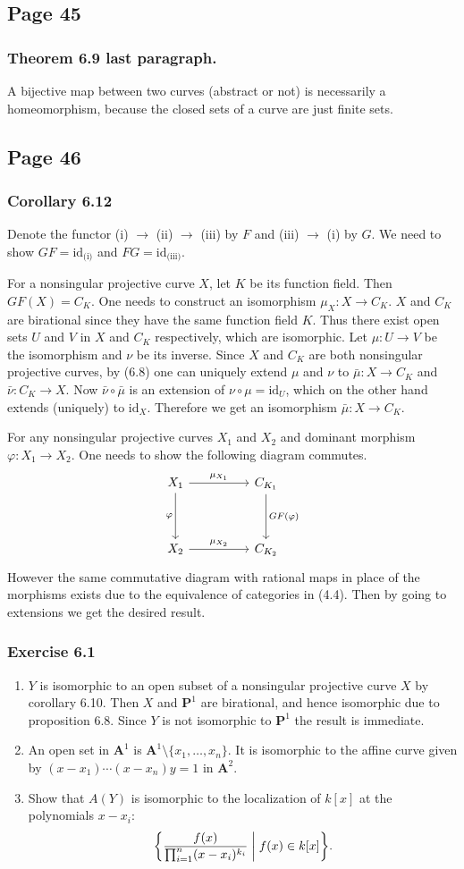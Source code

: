 \documentclass{note}
\newcommand{\Page}[1]{\subsection*{Page #1}}
\newcommand{\Ex}[1]{\subsubsection*{Exercise #1}}
\newcommand{\Affine}[1]{\mathbf{A}^{#1}}
\newcommand{\Proj}[1]{\mathbf{P}^{#1}}
\newcommand{\id}{\mathrm{id}}
\begin{document}
\Page{45}
\subsubsection*{Theorem 6.9 last paragraph.}
A bijective map between two curves (abstract or not) is necessarily a
homeomorphism, because the closed sets of a curve are just finite
sets.

\Page{46}
\subsubsection*{Corollary 6.12}
Denote the functor (i) $\to$ (ii) $\to$ (iii) by $F$ and (iii) $\to$
(i) by $G$. We need to show $GF=\id_{\text{(i)}}$ and
$FG=\id_{\text{(iii)}}$.

For a nonsingular projective curve $X$, let $K$ be its function
field. Then $GF(X) = C_K$. One needs to construct an isomorphism
$\mu_X\colon X\to C_K$. $X$ and $C_K$ are birational since they have
the same function field $K$. Thus there exist open sets $U$ and $V$ in
$X$ and $C_K$ respectively, which are isomorphic. Let
$\mu\colon U\to V$ be the isomorphism and $\nu$ be its inverse. Since
$X$ and $C_K$ are both nonsingular projective curves, by (6.8) one can
uniquely extend $\mu$ and $\nu$ to $\bar\mu\colon X\to C_K$ and
$\bar\nu\colon C_K\to X$. Now $\bar\nu\circ\bar\mu$ is an extension of
$\nu\circ\mu = \id_U$, which on the other hand extends (uniquely) to
$\id_X$. Therefore we get an isomorphism $\bar\mu\colon X\to C_K$.

For any nonsingular projective curves $X_1$ and $X_2$ and dominant
morphism $\varphi\colon X_1\to X_2$. One needs to show the following
diagram commutes.
\begin{equation*}
  \begin{tikzcd}[row sep=huge,column sep=huge]
    X_1 \arrow{r}{\mu_{X_1}} \arrow[swap]{d}{\varphi} & C_{K_1}
    \arrow{d}{GF(\varphi)} \\%
    X_2 \arrow{r}{\mu_{X_2}} & C_{K_2}
  \end{tikzcd}
\end{equation*}
However the same commutative diagram with rational maps in place of
the morphisms exists due to the equivalence of categories in
(4.4). Then by going to extensions we get the desired result.

\Ex{6.1}
\begin{enumerate}
\item $Y$ is isomorphic to an open subset of a nonsingular projective
  curve $X$ by corollary 6.10. Then $X$ and $\Proj1$ are birational,
  and hence isomorphic due to proposition 6.8. Since $Y$ is not
  isomorphic to $\Proj1$ the result is immediate.
\item An open set in $\Affine1$ is
  $\Affine1\setminus\{x_1,\dots,x_n\}$. It is isomorphic to the affine
  curve given by $(x-x_1)\cdots(x-x_n)y=1$ in $\Affine2$.
\item Show that $A(Y)$ is isomorphic to the localization of $k[x]$ at
  the polynomials $x-x_i\colon$
  \begin{equation*}
    \left\{ \frac{f(x)}{\prod_{i=1}^n(x-x_i)^{k_i}} \biggm\vert
      f(x) \in k[x] \right\}.
  \end{equation*}
\end{enumerate}
\end{document}
